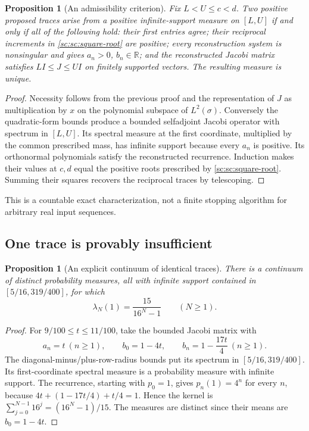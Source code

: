 \documentclass[11pt,a4paper]{article}
\newtheorem{proposition}[theorem]{Proposition}
\theoremstyle{definition}
\theoremstyle{remark}
\theoremstyle{plain}
\numberwithin{equation}{section}
\begin{document}
\begin{proposition}[An admissibility criterion]\label{sc:sc:admissible}
Fix $L<U\le c<d$. Two positive proposed traces arise from a positive
infinite-support measure on $[L,U]$ if and only if all of the following
hold: their first entries agree; their reciprocal increments in
\eqref{sc:sc:square-root} are positive; every reconstruction system is
nonsingular and gives $a_n>0$, $b_n\in\mathbb R$; and the reconstructed
Jacobi matrix satisfies $LI\le J\le UI$ on finitely supported vectors.
The resulting measure is unique.
\end{proposition}
\begin{proof}
Necessity follows from the previous proof and the representation of
$J$ as multiplication by $x$ on the polynomial subspace of $L^2(\sigma)$.
Conversely the quadratic-form bounds produce a bounded selfadjoint
Jacobi operator with spectrum in $[L,U]$. Its spectral measure at the
first coordinate, multiplied by the common prescribed mass, has infinite
support because every $a_n$ is positive. Its orthonormal polynomials
satisfy the reconstructed recurrence. Induction makes their values at
$c,d$ equal the positive roots prescribed by \eqref{sc:sc:square-root}.
Summing their squares recovers the reciprocal traces by telescoping.
\end{proof}
This is a countable exact characterization, not a finite stopping
algorithm for arbitrary real input sequences.

\subsection{One trace is provably insufficient}

\begin{proposition}[An explicit continuum of identical traces]
\label{sc:sc:one-trace-counterexample}
There is a continuum of distinct probability measures, all with infinite
support contained in $[5/16,319/400]$, for which
\[
 \lambda_N(1)=\frac{15}{16^N-1}\qquad(N\ge1).
\]
\end{proposition}
\begin{proof}
For $9/100\le t\le11/100$, take the bounded Jacobi matrix with
\[
 a_n=t\ (n\ge1),\qquad
 b_0=1-4t,\qquad b_n=1-\frac{17t}{4}\ (n\ge1).
\]
The diagonal-minus/plus-row-radius bounds put its spectrum in
$[5/16,319/400]$.  Its first-coordinate spectral measure is a probability
measure with infinite support.  The recurrence, starting with $p_0=1$,
gives $p_n(1)=4^n$ for every $n$, because
$4t+(1-17t/4)+t/4=1$.  Hence the kernel is
$\sum_{j=0}^{N-1}16^j=(16^N-1)/15$.  The measures are distinct since
their means are $b_0=1-4t$.
\end{proof}
\end{document}
